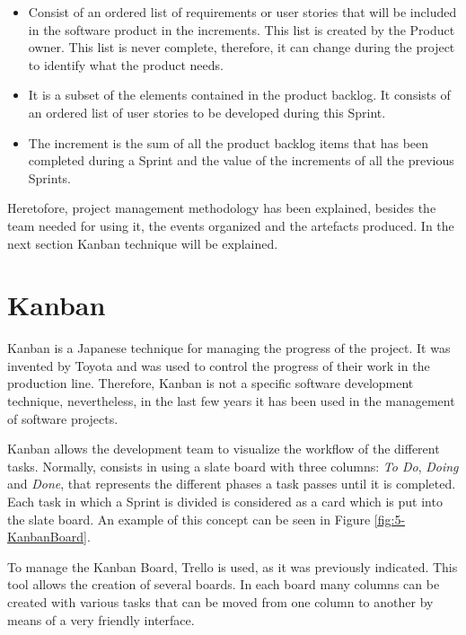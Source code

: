 \begin{itemize}
	\item {} Consist of an ordered list of requirements or user stories that will be included in the software product in the increments. This list is created by the Product owner. This list is never complete, therefore, it can change during the project to identify what the product needs. 
	
	\item {} It is a subset of the elements contained in the product backlog. It consists of an ordered list of user stories to be developed during this Sprint.
	
	\item {} The increment is the sum of all the product backlog items that has been completed during a Sprint and the value of the increments of all the previous Sprints.
\end{itemize}

Heretofore,  project management methodology has been explained, besides the team needed for using it, the events organized and the artefacts produced. In the next section Kanban technique will be explained.


\section{Kanban}

Kanban \cite{Gar11,KS10} is a Japanese technique for managing the progress of the project. It was invented by Toyota and was used to control the progress of their work in the production line. Therefore, Kanban is not a specific software development technique, nevertheless, in the last few years it has been used in the management of software projects.

Kanban allows the development team to visualize the workflow of the different tasks. Normally, consists in using a slate board with three columns: \emph{To Do}, \emph{Doing} and \emph{Done}, that represents the different phases a task passes until it is completed. Each task in which a Sprint is divided is considered as a card which is put into the slate board. An example of this concept can be seen in Figure \ref{fig:5-KanbanBoard}.

To manage the Kanban Board, Trello is used, as it was previously indicated. This tool allows the creation of several boards. In each board many columns can be created with various tasks that can be moved from one column to another by means of a very friendly interface.

